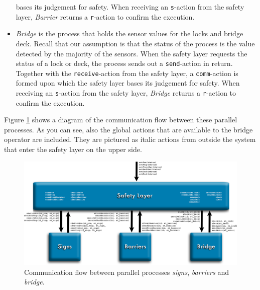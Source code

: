 \begin{itemize}
	bases its judgement for safety. When receiving an \texttt{s}-action from the safety layer, \emph{Barrier} returns a \texttt{r}-action to confirm the execution.
	\item \emph{Bridge} is the process that holds the sensor values for the locks and bridge deck. Recall that our assumption is that the status of the process is the value detected by the majority of the sensors. When the
	safety layer requests the status of a lock or deck, the process sends out a \texttt{send}-action in return. Together with the \texttt{receive}-action from the safety layer, a \texttt{comm}-action is formed upon which the safety
	layer 	bases its judgement for safety. When receiving an \texttt{s}-action from the safety layer, \emph{Bridge} returns a \texttt{r}-action to confirm the execution.
\end{itemize}
%
Figure \ref{fig:arch} shows a diagram of the communication flow between these parallel processes. As you can see, also the global actions that are available to the bridge operator are included. They are pictured as italic actions from outside the system that enter the safety layer on the upper side.
%
\begin{figure}[htb]%
\centering
\includegraphics[width=\columnwidth, angle=90]{Images/Architecture_2}%
\caption{Communication flow between parallel processes \emph{signs}, \emph{barriers} and \emph{bridge}.}%
\label{fig:arch}%
\end{figure}
%

